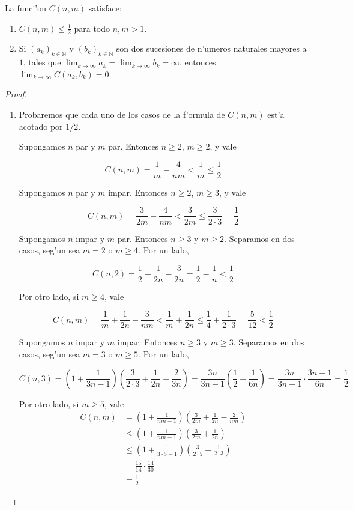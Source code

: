 \begin{lemma}
\label{le:propiedades_de_c}
La funci'on $C(n, m)$ satisface:

\begin{enumerate}
\item $C(n, m) \leq \frac{1}{2}$ para todo $n, m > 1$.

\item Si $(a_k)_{k \in \mathbb{N}}$ y $(b_k)_{k \in \mathbb{N}}$ son dos sucesiones de n'umeros naturales mayores a $1$, tales que $\displaystyle \lim_{k \to \infty} a_k = \lim_{k \to \infty} b_k = \infty$, entonces $\displaystyle \lim_{k \to \infty} C(a_k, b_k) = 0$.
\end{enumerate}

\begin{proof}
\hfill
\begin{enumerate}
\item Probaremos que cada uno de los casos de la f'ormula de $C(n, m)$ est'a acotado por $1/2$.

Supongamos $n$ par y $m$ par. Entonces $n \geq 2$, $m \geq 2$, y vale

\[C(n, m) = \frac{1}{m} - \frac{4}{nm} < \frac{1}{m} \leq \frac{1}{2}\]

Supongamos $n$ par y $m$ impar. Entonces $n \geq 2$, $m \geq 3$, y vale

\[C(n, m) = \frac{3}{2m} - \frac{4}{nm} < \frac{3}{2m} \leq \frac{3}{2 \cdot 3} = \frac{1}{2}\]

Supongamos $n$ impar y $m$ par. Entonces $n \geq 3$ y $m \geq 2$. Separamos en dos casos, seg'un sea $m = 2$ o $m \geq 4$. Por un lado,

\[C(n, 2) = \frac{1}{2} + \frac{1}{2n} - \frac{3}{2n} = \frac{1}{2} - \frac{1}{n} < \frac{1}{2}\]

\noindent
Por otro lado, si $m \geq 4$, vale

\[C(n, m) = \frac{1}{m} + \frac{1}{2n} - \frac{3}{nm} < \frac{1}{m} + \frac{1}{2n} \leq \frac{1}{4} + \frac{1}{2 \cdot 3} = \frac{5}{12} < \frac{1}{2}\]

Supongamos $n$ impar y $m$ impar. Entonces $n \geq 3$ y $m \geq 3$. Separamos en dos casos, seg'un sea $m = 3$ o $m \geq 5$. Por un lado,

\[C(n, 3) = \left(1 + \frac{1}{3n - 1}\right)\left(\frac{3}{2 \cdot 3} + \frac{1}{2n} - \frac{2}{3n} \right) = \frac{3n}{3n - 1}\left(\frac{1}{2} - \frac{1}{6n}\right) = \frac{3n}{3n - 1} \cdot \frac{3n - 1}{6n} = \frac{1}{2}\]

\noindent
Por otro lado, si $ m \geq 5$, vale
\begin{align*}
C(n, m) &= \left(1 + \frac{1}{nm - 1}\right)\left(\frac{3}{2m} + \frac{1}{2n} - \frac{2}{nm}\right)\\
&\leq \left(1 + \frac{1}{nm - 1}\right)\left(\frac{3}{2m} + \frac{1}{2n}\right)\\
&\leq \left(1 + \frac{1}{3 \cdot 5 - 1}\right) \left(\frac{3}{2 \cdot 5} + \frac{1}{2 \cdot 3}\right)\\
&= \frac{15}{14} \cdot \frac{14}{30}\\
&= \frac{1}{2}
\end{align*}


\end{enumerate}
\end{proof}
\end{lemma}
